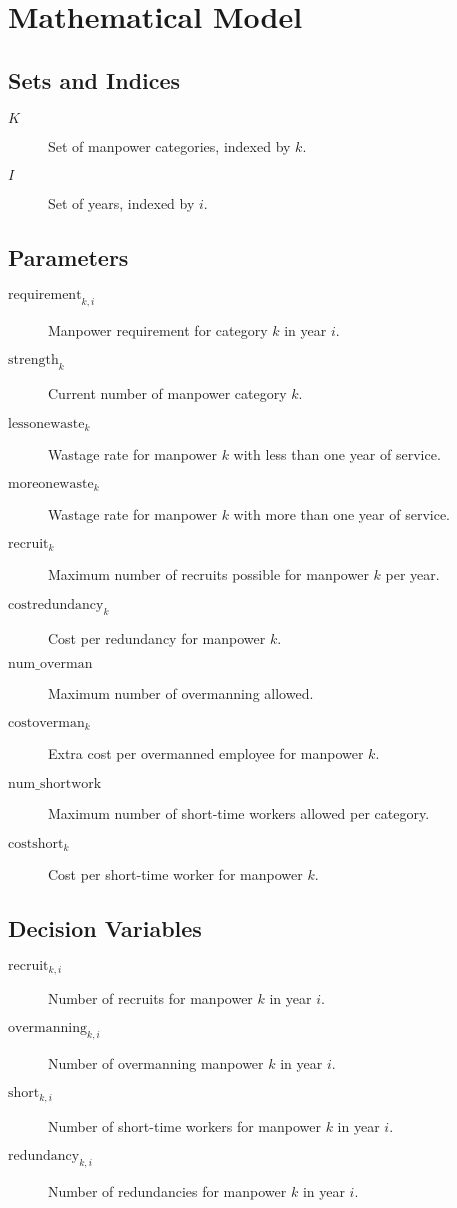 \documentclass{article}
\begin{document}
\section*{Mathematical Model}

\subsection*{Sets and Indices}
\begin{description}
    \item[$K$] Set of manpower categories, indexed by $k$.
    \item[$I$] Set of years, indexed by $i$.
\end{description}

\subsection*{Parameters}
\begin{description}
    \item[$\text{requirement}_{k,i}$] Manpower requirement for category $k$ in year $i$.
    \item[$\text{strength}_{k}$] Current number of manpower category $k$.
    \item[$\text{lessonewaste}_{k}$] Wastage rate for manpower $k$ with less than one year of service.
    \item[$\text{moreonewaste}_{k}$] Wastage rate for manpower $k$ with more than one year of service.
    \item[$\text{recruit}_{k}$] Maximum number of recruits possible for manpower $k$ per year.
    \item[$\text{costredundancy}_{k}$] Cost per redundancy for manpower $k$.
    \item[$\text{num\_overman}$] Maximum number of overmanning allowed.
    \item[$\text{costoverman}_{k}$] Extra cost per overmanned employee for manpower $k$.
    \item[$\text{num\_shortwork}$] Maximum number of short-time workers allowed per category.
    \item[$\text{costshort}_{k}$] Cost per short-time worker for manpower $k$.
\end{description}

\subsection*{Decision Variables}
\begin{description}
    \item[$\text{recruit}_{k,i}$] Number of recruits for manpower $k$ in year $i$.
    \item[$\text{overmanning}_{k,i}$] Number of overmanning manpower $k$ in year $i$.
    \item[$\text{short}_{k,i}$] Number of short-time workers for manpower $k$ in year $i$.
    \item[$\text{redundancy}_{k,i}$] Number of redundancies for manpower $k$ in year $i$.
\end{description}
\end{document}
